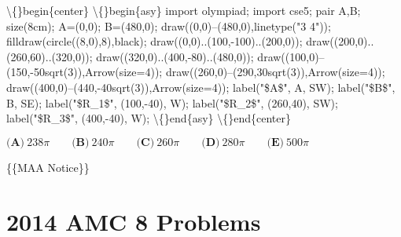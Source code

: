 \documentclass{article}
\begin{document}
\begin{enumerate}[label=\arabic*., itemsep=0.5em]
\textbackslash\{\}begin\{center\}
\textbackslash\{\}begin\{asy\}
import olympiad;
import cse5;
pair A,B;
size(8cm);
A=(0,0);
B=(480,0);
draw((0,0)--(480,0),linetype("3 4"));
filldraw(circle((8,0),8),black);
draw((0,0)..(100,-100)..(200,0));
draw((200,0)..(260,60)..(320,0));
draw((320,0)..(400,-80)..(480,0));
draw((100,0)--(150,-50sqrt(3)),Arrow(size=4));
draw((260,0)--(290,30sqrt(3)),Arrow(size=4));
draw((400,0)--(440,-40sqrt(3)),Arrow(size=4));
label("\$A\$", A, SW);
label("\$B\$", B, SE);
label("\$R\_1\$", (100,-40), W);
label("\$R\_2\$", (260,40), SW);
label("\$R\_3\$", (400,-40), W);
\textbackslash\{\}end\{asy\}
\textbackslash\{\}end\{center\}


\( \textbf{(A)}\ 238\pi\qquad\textbf{(B)}\ 240\pi\qquad\textbf{(C)}\ 260\pi\qquad\textbf{(D)}\ 280\pi\qquad\textbf{(E)}\ 500\pi \)



\{\{MAA Notice\}\}\par \vspace{0.5em}\end{enumerate}\newpage\section*{2014 AMC 8 Problems}
\end{document}
